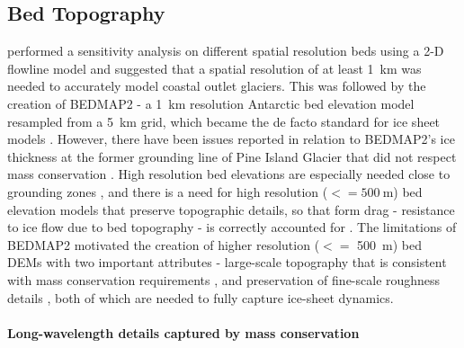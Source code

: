 

\subsection{Bed Topography}

\citet{DurandImpactbedrockdescription2011} performed a sensitivity analysis on different spatial resolution beds using a 2-D flowline model and suggested that a spatial resolution of at least \SI{1}{\kilo\metre} was needed to accurately model coastal outlet glaciers.
This was followed by the creation of BEDMAP2 \citep{FretwellBedmap2improvedice2013} - a \SI{1}{\kilo\metre} resolution Antarctic bed elevation model resampled from a \SI{5}{\kilo\metre} grid, which became the de facto standard for ice sheet models \citep[see e.g.][]{SeroussiinitMIPAntarcticaicesheet2019}.
However, there have been issues reported in relation to BEDMAP2's ice thickness at the former grounding line of Pine Island Glacier that did not respect mass conservation \citep{RignotWidespreadrapidgrounding2014}.
High resolution bed elevations are especially needed close to grounding zones \citep[e.g.][]{SchoofIcesheetgrounding2007,CornfordAdaptivemeshrefinement2016}, and there is a need for high resolution ($<= \SI{500}{\metre}$) bed elevation models that preserve topographic details, so that form drag - resistance to ice flow due to bed topography - is correctly accounted for \citep{BinghamDiverselandscapesPine2017,Kyrke-SmithRelevanceDetailBasal2018}.
The limitations of BEDMAP2 motivated the creation of higher resolution ($<=$ \SI{500}{\metre}) bed \gls{DEM}s with two important attributes - large-scale topography that is consistent with mass conservation requirements \citep[e.g.][]{Morlighemmassconservationapproach2011}, and preservation of fine-scale roughness details \citep[e.g.][]{GoffConditionalsimulationThwaites2014,Grahamhighresolutionsyntheticbed2017}, both of which are needed to fully capture ice-sheet dynamics.

\paragraph{Long-wavelength details captured by mass conservation}


